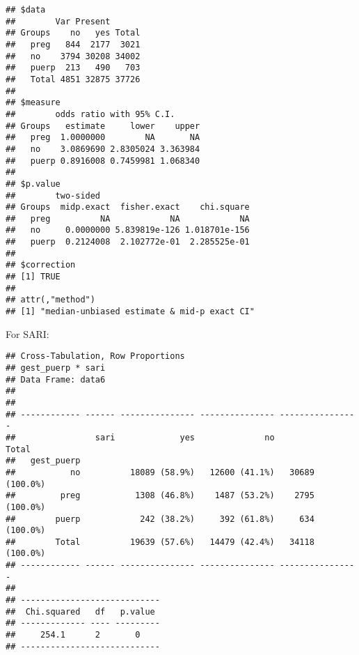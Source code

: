 \documentclass[
]{article}
\newenvironment{Shaded}{\begin{snugshade}}{\end{snugshade}}
\newcommand{\DataTypeTok}[1]{\textcolor[rgb]{0.13,0.29,0.53}{#1}}
\newcommand{\KeywordTok}[1]{\textcolor[rgb]{0.13,0.29,0.53}{\textbf{#1}}}
\newcommand{\NormalTok}[1]{#1}
\newcommand{\OperatorTok}[1]{\textcolor[rgb]{0.81,0.36,0.00}{\textbf{#1}}}
\newcommand{\OtherTok}[1]{\textcolor[rgb]{0.56,0.35,0.01}{#1}}
\newcommand{\StringTok}[1]{\textcolor[rgb]{0.31,0.60,0.02}{#1}}
\begin{document}
\begin{verbatim}
## $data
##        Var Present
## Groups    no   yes Total
##   preg   844  2177  3021
##   no    3794 30208 34002
##   puerp  213   490   703
##   Total 4851 32875 37726
## 
## $measure
##        odds ratio with 95% C.I.
## Groups   estimate     lower    upper
##   preg  1.0000000        NA       NA
##   no    3.0869690 2.8305024 3.363984
##   puerp 0.8916008 0.7459981 1.068340
## 
## $p.value
##        two-sided
## Groups  midp.exact  fisher.exact    chi.square
##   preg          NA            NA            NA
##   no     0.0000000 5.839819e-126 1.018701e-156
##   puerp  0.2124008  2.102772e-01  2.285525e-01
## 
## $correction
## [1] TRUE
## 
## attr(,"method")
## [1] "median-unbiased estimate & mid-p exact CI"
\end{verbatim}

For SARI:

\begin{Shaded}
\end{Shaded}

\begin{verbatim}
## Cross-Tabulation, Row Proportions  
## gest_puerp * sari  
## Data Frame: data6  
## 
## 
## ------------ ------ --------------- --------------- ----------------
##                sari             yes              no            Total
##   gest_puerp                                                        
##           no          18089 (58.9%)   12600 (41.1%)   30689 (100.0%)
##         preg           1308 (46.8%)    1487 (53.2%)    2795 (100.0%)
##        puerp            242 (38.2%)     392 (61.8%)     634 (100.0%)
##        Total          19639 (57.6%)   14479 (42.4%)   34118 (100.0%)
## ------------ ------ --------------- --------------- ----------------
## 
## ----------------------------
##  Chi.squared   df   p.value 
## ------------- ---- ---------
##     254.1      2       0    
## ----------------------------
\end{verbatim}

\begin{Shaded}
\end{Shaded}
\end{document}
